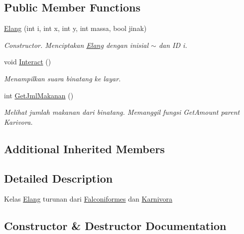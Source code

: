 \subsection*{Public Member Functions}
\begin{DoxyCompactItemize}
\item 
\hyperlink{classElang_a0498b01d6007cf95ea065322a4ef87fa}{Elang} (int i, int x, int y, int massa, bool jinak)
\begin{DoxyCompactList}\small\item\em Constructor. Menciptakan \hyperlink{classElang}{Elang} dengan inisial \textquotesingle{}$\sim$\textquotesingle{} dan ID i. \end{DoxyCompactList}\item 
void \hyperlink{classElang_a0ab640b797d57d2a7068eb062bd81806}{Interact} ()\hypertarget{classElang_a0ab640b797d57d2a7068eb062bd81806}{}\label{classElang_a0ab640b797d57d2a7068eb062bd81806}

\begin{DoxyCompactList}\small\item\em Menampilkan suara binatang ke layar. \end{DoxyCompactList}\item 
int \hyperlink{classElang_a6d017711dba92202dfad0126d636a28a}{Get\+Jml\+Makanan} ()
\begin{DoxyCompactList}\small\item\em Melihat jumlah makanan dari binatang. Memanggil fungsi Get\+Amount parent Karivora. \end{DoxyCompactList}\end{DoxyCompactItemize}
\subsection*{Additional Inherited Members}


\subsection{Detailed Description}
Kelas \hyperlink{classElang}{Elang} turunan dari \hyperlink{classFalconiformes}{Falconiformes} dan \hyperlink{classKarnivora}{Karnivora} 

\subsection{Constructor \& Destructor Documentation}
